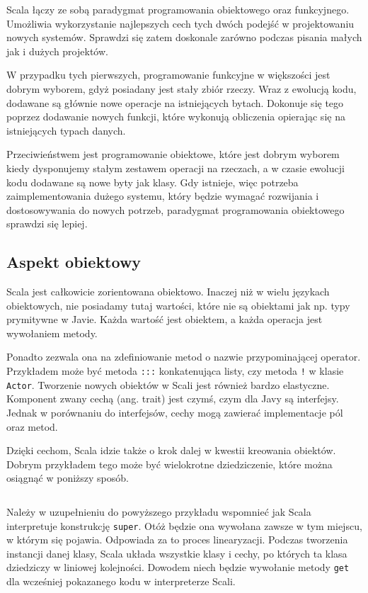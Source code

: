 \documentclass[brudnopis]{xmgr}
\begin{document}
Scala łączy ze sobą paradygmat programowania obiektowego oraz funkcyjnego. Umożliwia wykorzystanie najlepszych cech tych dwóch podejść w projektowaniu nowych systemów. Sprawdzi się zatem doskonale zarówno podczas pisania małych jak i dużych projektów.

W przypadku tych pierwszych, programowanie funkcyjne w większości jest dobrym wyborem, gdyż posiadany jest stały zbiór rzeczy. Wraz z ewolucją kodu, dodawane są głównie nowe operacje na istniejących bytach. Dokonuje się tego poprzez dodawanie nowych funkcji, które wykonują obliczenia opierając się na istniejących typach danych. 

Przeciwieństwem jest programowanie obiektowe, które jest dobrym wyborem kiedy dysponujemy stałym zestawem operacji na rzeczach, a w czasie ewolucji kodu dodawane są nowe byty jak klasy. Gdy istnieje, więc potrzeba zaimplementowania dużego systemu, który będzie wymagać rozwijania i dostosowywania do nowych potrzeb, paradygmat programowania obiektowego sprawdzi się lepiej.

\subsection{Aspekt obiektowy}

Scala jest całkowicie zorientowana obiektowo. Inaczej niż w wielu językach obiektowych, nie posiadamy tutaj wartości, które nie są obiektami jak np. typy prymitywne w Javie. Każda wartość jest obiektem, a każda operacja jest wywołaniem metody. 

Ponadto zezwala ona na zdefiniowanie metod o nazwie przypominającej operator. Przykładem może być metoda \texttt{:::} konkatenująca listy, czy metoda \texttt{!} w klasie \texttt{Actor}. Tworzenie nowych obiektów w Scali jest również bardzo elastyczne. Komponent zwany cechą (ang. trait) jest czymś, czym dla Javy są interfejsy. Jednak w porównaniu do interfejsów, cechy mogą zawierać implementacje pól oraz metod. 

Dzięki cechom, Scala idzie także o krok dalej w kwestii kreowania obiektów. Dobrym przykładem tego może być wielokrotne dziedziczenie, które można osiągnąć w poniższy sposób.

\inputminted[fontsize=\small]{scala}{code/multipleInheritance.scala}

Należy w uzupełnieniu do powyższego przykładu wspomnieć jak Scala interpretuje konstrukcję \texttt{super}. Otóż będzie ona wywołana zawsze w tym miejscu, w którym się pojawia. Odpowiada za to proces linearyzacji. Podczas tworzenia instancji danej klasy, Scala układa wszystkie klasy i cechy, po których ta klasa dziedziczy w liniowej kolejności. Dowodem niech będzie wywołanie metody \texttt{get} dla wcześniej pokazanego kodu w interpreterze Scali.
\end{document}
